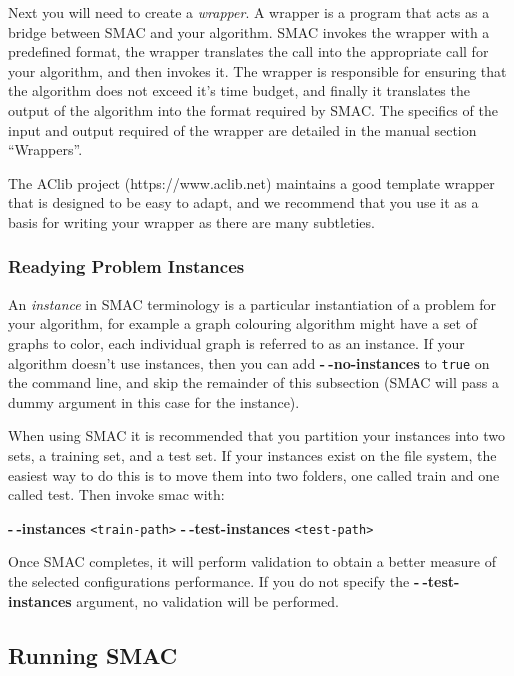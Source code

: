 \documentclass[11pt,letterpaper,twoside]{article}
\begin{document}
Next you will need to create a \emph{wrapper}. A wrapper is a program that acts as a bridge between SMAC and your algorithm.  SMAC invokes the wrapper with a predefined format, the wrapper translates the call into the appropriate call for your algorithm, and then invokes it. The wrapper is responsible for ensuring that the algorithm does not exceed it's time budget, and finally it translates the output of the algorithm into the format required by SMAC. The specifics of the input and output required of the wrapper are detailed in the manual section ``Wrappers''.

The AClib project (https://www.aclib.net) maintains a good template wrapper that is designed to be easy to adapt, and we recommend that you use it as a basis for writing your wrapper as there are many subtleties.

\subsubsection{Readying Problem Instances}

An \emph{instance} in SMAC terminology is a particular instantiation of a problem for your algorithm, for example a graph colouring algorithm might have a set of graphs to color, each individual graph is referred to as an instance. If your algorithm doesn't use instances, then you can add \textbf{-$~\!$-no-instances} to \texttt{true} on the command line, and skip the remainder of this subsection (SMAC will pass a dummy argument in this case for the instance).

When using SMAC it is recommended that you partition your instances into two sets, a training set, and a test set. If your instances exist on the file system, the easiest way to do this is to move them into two folders, one called train and one called test. Then invoke smac with:

\textbf{-$~\!$-instances} \texttt{<train-path>} \textbf{-$~\!$-test-instances} \texttt{<test-path>}

Once SMAC completes, it will perform validation to obtain a better measure of the selected configurations performance. If you do not specify the \textbf{-$~\!$-test-instances} argument, no validation will be performed. 

\subsection{Running SMAC}
\end{document}
